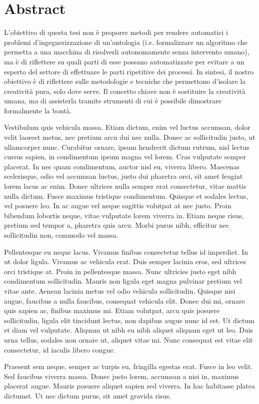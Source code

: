 \chapter*{Abstract}

L'obiettivo di questa tesi non è proporre metodi per rendere automatici i problemi d'ingegnerizzazione di un'ontologia (i.e. formalizzare un algoritmo che permetta a una macchina di risolverli autonomamente senza intervento umano), ma è di riflettere su quali parti di esse possano automatizzate per evitare a un esperto del settore di effettuare le parti ripetitive dei processi. In sintesi, il nostro obiettivo è di riflettere sulle metodologie e tecniche che permettono d'isolare la creatività pura, solo dove serve. Il concetto chiave non è sostituire la creatività umana, ma di assisterla tramite strumenti di cui è possibile dimostrare formalmente la bontà.

Vestibulum quis vehicula massa. Etiam dictum, enim vel luctus accumsan, dolor velit laoreet metus, nec pretium arcu dui nec nulla. Donec ac sollicitudin justo, ut ullamcorper nunc. Curabitur ornare, ipsum hendrerit dictum rutrum, nisl lectus cursus sapien, in condimentum ipsum magna vel lorem. Cras vulputate semper placerat. In nec quam condimentum, auctor nisl eu, viverra libero. Maecenas scelerisque, odio vel accumsan luctus, justo dui pharetra orci, sit amet feugiat lorem lacus ac enim. Donec ultrices nulla semper erat consectetur, vitae mattis nulla dictum. Fusce maximus tristique condimentum. Quisque et sodales lectus, vel posuere leo. In ac augue vel neque sagittis volutpat at nec justo. Proin bibendum lobortis neque, vitae vulputate lorem viverra in. Etiam neque risus, pretium sed tempor a, pharetra quis arcu. Morbi purus nibh, efficitur nec sollicitudin non, commodo vel massa.

Pellentesque eu neque lacus. Vivamus finibus consectetur tellus id imperdiet. In ut dolor ligula. Vivamus ac vehicula erat. Duis semper lacinia eros, sed ultrices orci tristique at. Proin in pellentesque massa. Nunc ultricies justo eget nibh condimentum sollicitudin. Mauris non ligula eget magna pulvinar pretium vel vitae ante. Aenean lacinia metus vel odio vehicula sollicitudin. Quisque nisi augue, faucibus a nulla faucibus, consequat vehicula elit. Donec dui mi, ornare quis sapien ac, finibus maximus mi. Etiam volutpat, arcu quis posuere sollicitudin, ligula elit tincidunt lectus, non dapibus augue nunc id est. Ut dictum et diam vel vulputate. Aliquam ut nibh eu nibh aliquet aliquam eget ut leo. Duis urna tellus, sodales non ornare ut, aliquet vitae mi. Nunc consequat est vitae elit consectetur, id iaculis libero congue.

Praesent sem neque, semper ac turpis eu, fringilla egestas erat. Fusce in leo velit. Sed faucibus viverra massa. Donec justo lorem, accumsan a nisi in, maximus placerat augue. Mauris posuere aliquet sapien sed viverra. In hac habitasse platea dictumst. Ut nec dictum purus, sit amet gravida risus.
